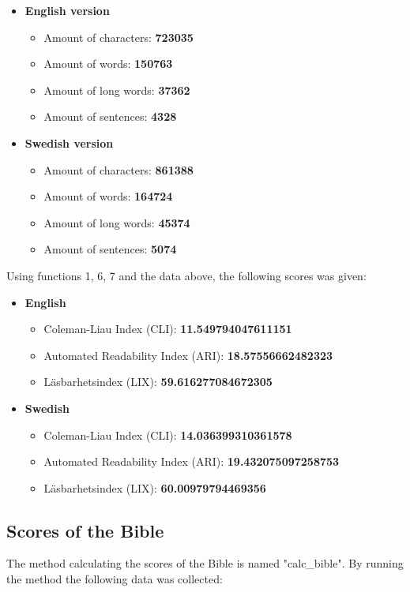 \documentclass[a4paper]{article}
\begin{document}
\begin{itemize}
	\item \textbf{English version}
	\begin{itemize}
		\item Amount of characters: \textbf{723035}
		\item Amount of words: \textbf{150763}
		\item Amount of long words: \textbf{37362}
		\item Amount of sentences: \textbf{4328}
	\end{itemize}
	\item \textbf{Swedish version}
	\begin{itemize}
		\item Amount of characters: \textbf{861388}
		\item Amount of words: \textbf{164724}
		\item Amount of long words: \textbf{45374}
		\item Amount of sentences: \textbf{5074}
	\end{itemize}
\end{itemize}

Using functions 1, 6, 7 and the data above, the following scores was given:

\begin{itemize}
    \item \textbf{English}
    \begin{itemize}
        \item Coleman-Liau Index (CLI): \textbf{11.549794047611151}
        \item Automated Readability Index (ARI): \textbf{18.57556662482323}
        \item Läsbarhetsindex (LIX): \textbf{59.616277084672305}
    \end{itemize}
    \item \textbf{Swedish}
    \begin{itemize}
        \item Coleman-Liau Index (CLI): \textbf{14.036399310361578}
        \item Automated Readability Index (ARI): \textbf{19.432075097258753}
        \item Läsbarhetsindex (LIX): \textbf{60.00979794469356}
    \end{itemize}
\end{itemize}

\subsection{Scores of the Bible}
The method calculating the scores of the Bible is named "calc\_bible". By running the method the following data was collected:
\end{document}
